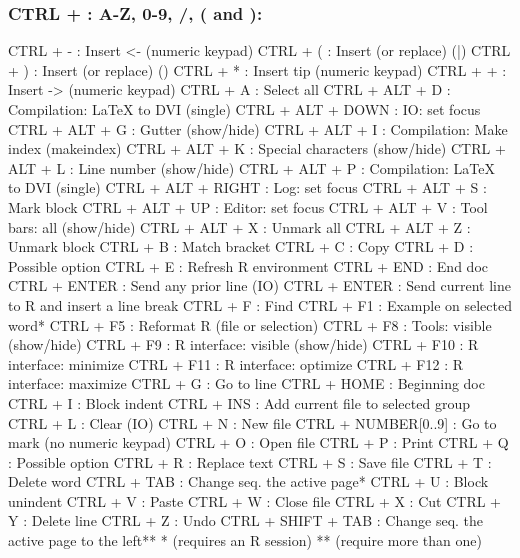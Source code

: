 \newpage
\subsubsection{CTRL + : A-Z, 0-9, /, ( and ):}

\vspace{-0.5cm}
\begin{Rtables}[caption={[CTRL keyboard shortcuts]
    CTRL keyboard shortcuts},
  label=shortcut:ctrl]
  CTRL + -                : Insert <-  (numeric keypad)
  CTRL + (                : Insert (or replace) (|)
  CTRL + )                : Insert (or replace) ()
  CTRL + *                : Insert tip (numeric keypad)
  CTRL + +                : Insert ->  (numeric keypad)
  CTRL + A                : Select all
  CTRL + ALT + D          : Compilation: LaTeX to DVI (single)
  CTRL + ALT + DOWN       : IO: set focus
  CTRL + ALT + G          : Gutter (show/hide)
  CTRL + ALT + I          : Compilation: Make index (makeindex)
  CTRL + ALT + K          : Special characters (show/hide)
  CTRL + ALT + L          : Line number (show/hide)
  CTRL + ALT + P          : Compilation: LaTeX to DVI (single)
  CTRL + ALT + RIGHT      : Log: set focus
  CTRL + ALT + S          : Mark block
  CTRL + ALT + UP         : Editor: set focus
  CTRL + ALT + V          : Tool bars: all (show/hide)
  CTRL + ALT + X          : Unmark all
  CTRL + ALT + Z          : Unmark block
  CTRL + B                : Match bracket
  CTRL + C                : Copy
  CTRL + D                : Possible option
  CTRL + E                : Refresh R environment
  CTRL + END              : End doc
  CTRL + ENTER            : Send any prior line (IO)
  CTRL + ENTER            : Send current line to R and insert a line break
  CTRL + F                : Find
  CTRL + F1               : Example on selected word*
  CTRL + F5               : Reformat R (file or selection)
  CTRL + F8               : Tools: visible (show/hide)
  CTRL + F9               : R interface: visible (show/hide)
  CTRL + F10              : R interface: minimize
  CTRL + F11              : R interface: optimize
  CTRL + F12              : R interface: maximize
  CTRL + G                : Go to line
  CTRL + HOME             : Beginning doc
  CTRL + I                : Block indent
  CTRL + INS              : Add current file to selected group
  CTRL + L                : Clear (IO)
  CTRL + N                : New file
  CTRL + NUMBER[0..9]     : Go to mark (no numeric keypad)
  CTRL + O                : Open file
  CTRL + P                : Print
  CTRL + Q                : Possible option
  CTRL + R                : Replace text
  CTRL + S                : Save file
  CTRL + T                : Delete word
  CTRL + TAB              : Change seq. the active page*
  CTRL + U                : Block unindent
  CTRL + V                : Paste
  CTRL + W                : Close file
  CTRL + X                : Cut
  CTRL + Y                : Delete line
  CTRL + Z                : Undo
  CTRL + SHIFT + TAB      : Change seq. the active page to the left**
  *  (requires an R session)
  ** (require more than one)
\end{Rtables}
